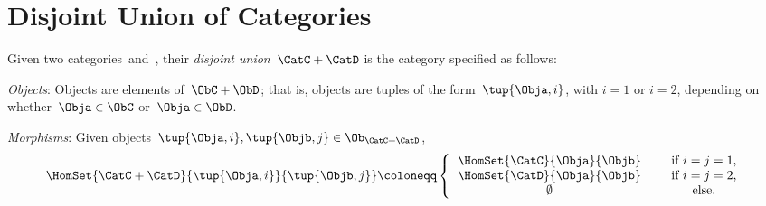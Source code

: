 

\section{Disjoint Union of Categories}


\begin{ctdefinition}
    \label{def:disjoint-union-category}
    Given two categories~\CatC and~\CatD, their \emph{disjoint union}~$\CatC + \CatD$ is the category specified as follows:
    \begin{compactenum}
        \item \emph{Objects}: Objects are elements of~$\ObC + \ObD$; that is, objects are tuples of the form~$\tup{\Obja, i}$, with $i=1$ or $i=2$, depending on whether~$\Obja \in \ObC$ or~$\Obja \in \ObD$.
        \item \emph{Morphisms}: Given objects~$\tup{\Obja, i}, \tup{\Objb, j} \in \Ob_{\CatC + \CatD}$,
        \begin{equation}
            \HomSet{\CatC + \CatD}{\tup{\Obja, i}}{\tup{\Objb, j}} \coloneqq
            \left\{
            \begin{tabular}{ccc}
                $\HomSet{\CatC}{\Obja}{\Objb}$ & & if $i=j = 1$,  \\
                $\HomSet{\CatD}{\Obja}{\Objb}$ & & if $i = j =2$, \\
                $\emptyset$                    & & else.
            \end{tabular}
            \right.
        \end{equation}


\end{compactenum}
\end{ctdefinition}
